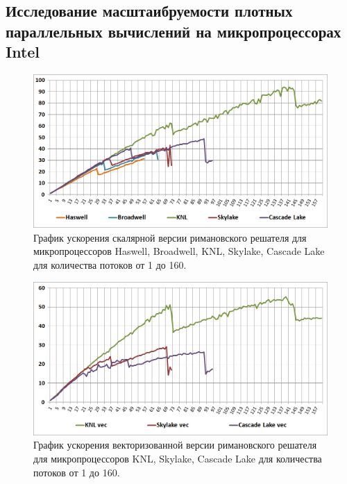\subsection{Исследование масштаибруемости плотных параллельных вычислений на микропроцессорах Intel}

\begin{figure}[ht]
	\centering
	\includegraphics[width=1.0\textwidth]{./pics/text_3_omp2/speedup_scalar.png}
	\caption{График ускорения скалярной версии римановского решателя для микропроцессоров Haswell, Broadwell, KNL, Skylake, Cascade Lake для количества потоков от 1 до 160.}
	\label{fig:text_3_omp2_speedup_scalar}
\end{figure}

\begin{figure}[ht]
	\centering
	\includegraphics[width=1.0\textwidth]{./pics/text_3_omp2/speedup_vec.png}
	\caption{График ускорения векторизованной версии римановского решателя для микропроцессоров KNL, Skylake, Cascade Lake для количества потоков от 1 до 160.}
	\label{fig:text_3_omp2_speedup_vec}
\end{figure}

